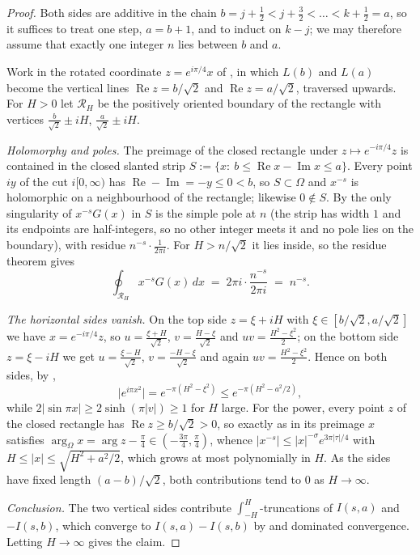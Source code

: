 \begin{proof}
\leanok
Both sides are additive in the chain $b=j+\tfrac12<j+\tfrac32<\dots<k+\tfrac12=a$, so it
suffices to treat one step, $a=b+1$, and to induct on $k-j$; we may therefore assume that
exactly one integer $n$ lies between $b$ and $a$.

Work in the rotated coordinate $z=e^{i\pi/4}x$ of , in which $L(b)$
and $L(a)$ become the vertical lines $\operatorname{Re}z=b/\sqrt2$ and
$\operatorname{Re}z=a/\sqrt2$, traversed upwards.  For $H>0$ let $\mathcal{R}_{H}$ be the
positively oriented boundary of the rectangle with vertices
$\tfrac{b}{\sqrt2}\pm iH$, $\tfrac{a}{\sqrt2}\pm iH$.

\emph{Holomorphy and poles.}  The preimage of the closed rectangle under
$z\mapsto e^{-i\pi/4}z$ is contained in the closed slanted strip
$S:=\{x:\ b\le\operatorname{Re}x-\operatorname{Im}x\le a\}$.  Every point $iy$ of the cut
$i[0,\infty)$ has $\operatorname{Re}-\operatorname{Im}=-y\le0<b$, so $S\subset\Omega$ and
$x^{-s}$ is holomorphic on a neighbourhood of the rectangle; likewise $0\notin S$.  By
 the only singularity of $x^{-s}G(x)$ in $S$ is the simple
pole at $n$ (the strip has width $1$ and its endpoints are half-integers, so no other
integer meets it and no pole lies on the boundary), with residue
$n^{-s}\cdot\tfrac1{2\pi i}$.  For $H>n/\sqrt2$ it lies inside, so the residue theorem
gives
\[
  \oint_{\mathcal{R}_{H}}x^{-s}G(x)\,dx\;=\;2\pi i\cdot\frac{n^{-s}}{2\pi i}\;=\;n^{-s}.
\]

\emph{The horizontal sides vanish.}  On the top side $z=\xi+iH$ with
$\xi\in[b/\sqrt2,a/\sqrt2]$ we have $x=e^{-i\pi/4}z$, so
$u=\tfrac{\xi+H}{\sqrt2}$, $v=\tfrac{H-\xi}{\sqrt2}$ and $uv=\tfrac{H^{2}-\xi^{2}}2$;
on the bottom side $z=\xi-iH$ we get $u=\tfrac{\xi-H}{\sqrt2}$, $v=\tfrac{-H-\xi}{\sqrt2}$
and again $uv=\tfrac{H^{2}-\xi^{2}}2$.  Hence on both sides, by
,
\[
  \bigl|e^{i\pi x^{2}}\bigr|=e^{-\pi(H^{2}-\xi^{2})}\le e^{-\pi(H^{2}-a^{2}/2)} ,
\]
while $2\lvert\sin \pi x\rvert\ge2\sinh(\pi\lvert v\rvert)\ge 1$ for $H$ large.  For the
power, every point $z$ of the closed rectangle has $\operatorname{Re}z\ge b/\sqrt2>0$, so
exactly as in  its preimage $x$ satisfies
$\arg_{\Omega}x=\arg z-\tfrac\pi4\in(-\tfrac{3\pi}4,\tfrac\pi4)$, whence
$\lvert x^{-s}\rvert\le\lvert x\rvert^{-\sigma}e^{3\pi|\tau|/4}$ with
$H\le\lvert x\rvert\le\sqrt{H^{2}+a^{2}/2}$, which grows at most polynomially in $H$.  As the
sides have fixed length $(a-b)/\sqrt2$, both contributions tend to $0$ as $H\to\infty$.

\emph{Conclusion.}  The two vertical sides contribute
$\int_{-H}^{H}$-truncations of $I(s,a)$ and $-I(s,b)$, which converge to $I(s,a)-I(s,b)$
by  and dominated convergence.  Letting $H\to\infty$ gives the
claim.
\end{proof}


